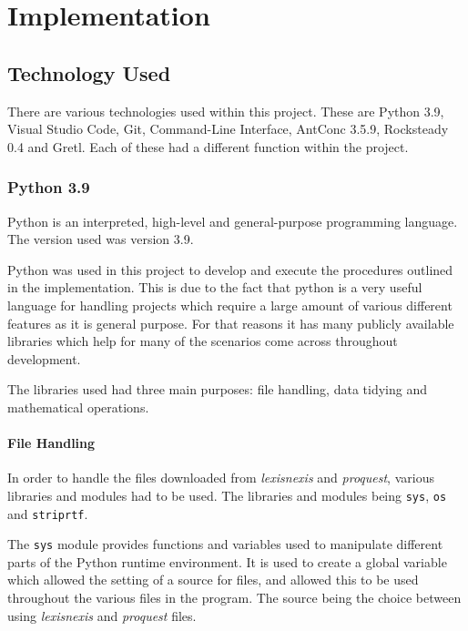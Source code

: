 
\chapter{Implementation}

\section{Technology Used}

There are various technologies used within this project. These are Python 3.9, Visual Studio Code, Git, Command-Line Interface, AntConc 3.5.9, Rocksteady 0.4 and Gretl. Each of these had a different function within the project.

\subsection{Python 3.9}

Python is an interpreted, high-level and general-purpose programming language. The version used was version 3.9. 

Python was used in this project to develop and execute the procedures outlined in the implementation. This is due to the fact that python is a very useful language for handling projects which require a large amount of various different features as it is general purpose. For that reasons it has many publicly available libraries which help for many of the scenarios come across throughout development.

The libraries used had three main purposes: file handling, data tidying and mathematical operations.

\subsubsection{File Handling}

In order to handle the files downloaded from \emph{lexisnexis} and \emph{proquest}, various libraries and modules had to be used. The libraries and modules being \verb|sys|, \verb|os| and \verb|striprtf|.

The \verb|sys| module provides functions and variables used to manipulate different parts of the Python runtime environment. It is used to create a global variable which allowed the setting of a source for files, and allowed this to be used throughout the various files in the program. The source being the choice between using \emph{lexisnexis} and \emph{proquest} files.

